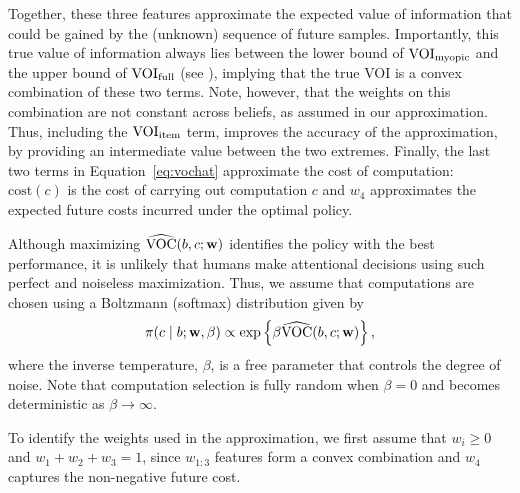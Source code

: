 Together, these three features approximate the expected value of information that could be gained by the (unknown) sequence of future samples. Importantly, this true value of information always lies between the lower bound of $\text{VOI}_\text{myopic}$ and the upper bound of $\text{VOI}_\text{full}$ (see ), implying that the true VOI is a convex combination of these two terms. Note, however, that the weights on this combination are not constant across beliefs, as assumed in our approximation. Thus, including the $\text{VOI}_\text{item}$ term, improves the accuracy of the approximation, by providing an intermediate value between the two extremes. Finally, the last two terms in Equation~\ref{eq:vochat} approximate the cost of computation: $\text{cost}(c)$ is the cost of carrying out computation $c$ and $w_{4}$ approximates the expected future costs incurred under the optimal policy.

Although maximizing $\widehat{\text{VOC}}(b, c; \mathbf{w})$ identifies the policy with the best performance, it is unlikely that humans make attentional decisions using such perfect and noiseless maximization. Thus, 
we assume that computations are chosen using a Boltzmann (softmax) distribution   \citep{mcfadden2001economic} given  by
\[
\pi(c \mid b; \mathbf{w}, \beta) \propto \exp \left\{ \beta\widehat{\text{VOC}}(b, c; \mathbf{w}) \right\},
\]
where the inverse temperature, $\beta$, is a free parameter that controls the degree of noise. Note that computation selection is fully random when $\beta=0$ and becomes deterministic as $\beta\rightarrow\infty$.



To identify the weights used in the approximation, we first assume that $w_{i}\ge0$ and $w_{1}+w_{2}+w_{3}=1$, since $w_{1:3}$ features form a convex combination and $w_4$ captures the non-negative future cost.